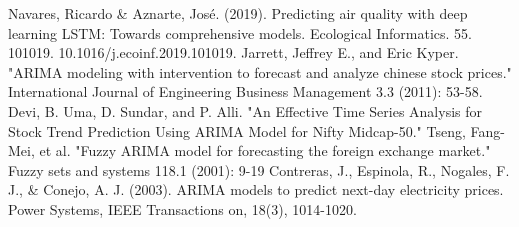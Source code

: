 \documentclass[conference]{IEEEtran}
\begin{document}
\begin{thebibliography}{00}
     Navares, Ricardo \& Aznarte, José. (2019). Predicting air quality with deep learning LSTM: Towards comprehensive models. Ecological Informatics. 55. 101019. 10.1016/j.ecoinf.2019.101019. 
     Jarrett, Jeffrey E., and Eric Kyper. "ARIMA modeling with intervention to forecast and analyze chinese stock prices." International Journal of Engineering Business Management 3.3 (2011): 53-58.
     Devi, B. Uma, D. Sundar, and P. Alli. "An Effective Time Series Analysis for Stock Trend Prediction Using ARIMA Model for Nifty Midcap-50."
     Tseng, Fang-Mei, et al. "Fuzzy ARIMA model for forecasting the foreign exchange market." Fuzzy sets and systems 118.1 (2001): 9-19
     Contreras, J., Espinola, R., Nogales, F. J., \& Conejo, A. J. (2003). ARIMA models to predict next-day electricity prices. Power Systems, IEEE Transactions on, 18(3), 1014-1020.
\end{thebibliography}
\end{document}
